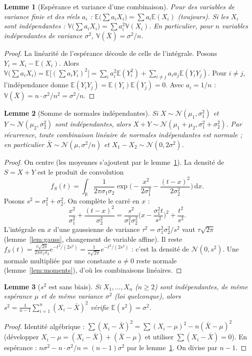 \documentclass[11pt,a4paper]{article}
\theoremstyle{tq}
\newtheorem{lem}{Lemme}
\theoremstyle{remark}
\newcommand{\E}{\mathbb{E}}
\newcommand{\V}{\mathbb{V}}
\newcommand{\R}{\mathbb{R}}
\newcommand{\N}{\mathcal{N}}
\newcommand{\Xb}{\bar{X}}
\newcommand{\dd}{\,\mathrm{d}}
\begin{document}
\begin{lem}[Espérance et variance d'une combinaison]\label{lem:var}
Pour des variables de variance finie et des réels $a_i$ : $\E\big(\sum a_iX_i\big)=\sum a_i\E(X_i)$ (toujours). Si les $X_i$ sont indépendantes : $\V\big(\sum a_iX_i\big)=\sum a_i^2\V(X_i)$. En particulier, pour $n$ variables indépendantes de variance $\sigma^2$, $\V(\Xb)=\sigma^2/n$.
\end{lem}
\begin{proof}
La linéarité de l'espérance découle de celle de l'intégrale. Posons $Y_i=X_i-\E(X_i)$. Alors
$\V\big(\sum a_iX_i\big)=\E\big[(\sum a_iY_i)^2\big]=\sum_i a_i^2\E(Y_i^2)+\sum_{i\neq j}a_ia_j\E(Y_iY_j)$.
Pour $i\neq j$, l'indépendance donne $\E(Y_iY_j)=\E(Y_i)\E(Y_j)=0$. Avec $a_i=1/n$ : $\V(\Xb)=n\cdot\sigma^2/n^2=\sigma^2/n$.
\end{proof}

\begin{lem}[Somme de normales indépendantes]\label{lem:stab}
Si $X\sim\N(\mu_1,\sigma_1^2)$ et $Y\sim\N(\mu_2,\sigma_2^2)$ sont indépendantes, alors $X+Y\sim\N(\mu_1+\mu_2,\sigma_1^2+\sigma_2^2)$. Par récurrence, toute combinaison linéaire de normales indépendantes est normale ; en particulier $\Xb\sim\N(\mu,\sigma^2/n)$ et $X_1-X_2\sim\N(0,2\sigma^2)$.
\end{lem}
\begin{proof}
On centre (les moyennes s'ajoutent par le lemme~\ref{lem:var}). La densité de $S=X+Y$ est le produit de convolution
\[
f_S(t)=\int_{\R}\frac{1}{2\pi\sigma_1\sigma_2}\exp\!\Big(-\frac{x^2}{2\sigma_1^2}-\frac{(t-x)^2}{2\sigma_2^2}\Big)\dd x .
\]
Posons $s^2=\sigma_1^2+\sigma_2^2$. On complète le carré en $x$ :
\[
\frac{x^2}{\sigma_1^2}+\frac{(t-x)^2}{\sigma_2^2}=\frac{s^2}{\sigma_1^2\sigma_2^2}\Big(x-\frac{\sigma_1^2t}{s^2}\Big)^2+\frac{t^2}{s^2}.
\]
L'intégrale en $x$ d'une gaussienne de variance $\tau^2=\sigma_1^2\sigma_2^2/s^2$ vaut $\tau\sqrt{2\pi}$ (lemme~\ref{lem:gauss}, changement de variable affine). Il reste
$f_S(t)=\frac{\tau\sqrt{2\pi}}{2\pi\sigma_1\sigma_2}e^{-t^2/(2s^2)}=\frac{1}{s\sqrt{2\pi}}e^{-t^2/(2s^2)}$ : c'est la densité de $\N(0,s^2)$. Une normale multipliée par une constante $a\neq0$ reste normale (lemme~\ref{lem:moments}), d'où les combinaisons linéaires.
\end{proof}

\begin{lem}[$s^2$ est sans biais]\label{lem:s2}
Si $X_1,\dots,X_n$ ($n\ge2$) sont indépendantes, de même espérance $\mu$ et de même variance $\sigma^2$ (loi quelconque), alors
$s^2=\frac{1}{n-1}\sum_{i=1}^n(X_i-\Xb)^2$ vérifie $\E(s^2)=\sigma^2$.
\end{lem}
\begin{proof}
Identité algébrique : $\sum(X_i-\Xb)^2=\sum(X_i-\mu)^2-n(\Xb-\mu)^2$ (développer $X_i-\mu=(X_i-\Xb)+(\Xb-\mu)$ et utiliser $\sum(X_i-\Xb)=0$). En espérance : $n\sigma^2-n\cdot\sigma^2/n=(n-1)\sigma^2$ par le lemme~\ref{lem:var}. On divise par $n-1$.
\end{proof}
\end{document}
